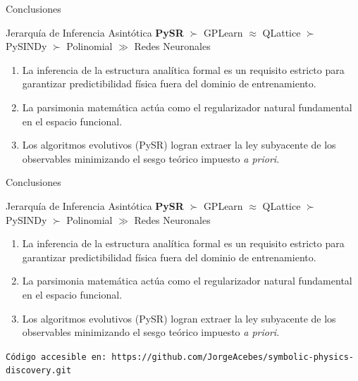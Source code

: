 \documentclass[10pt, aspectratio=169]{beamer}
\begin{document}
\begin{frame}{Conclusiones}
    \begin{block}{Jerarquía de Inferencia Asintótica}
        \centering\medskip
        \large \textbf{PySR} $\succ$ GPLearn $\approx$ QLattice $\succ$ PySINDy $\succ$ Polinomial $\gg$ Redes Neuronales
    \end{block}

    \vspace{0.5cm}
    \begin{enumerate}
        \item La inferencia de la estructura analítica formal es un requisito estricto para garantizar predictibilidad física fuera del dominio de entrenamiento.
        \item La parsimonia matemática actúa como el regularizador natural fundamental en el espacio funcional.
        \item Los algoritmos evolutivos (PySR) logran extraer la ley subyacente de los observables minimizando el sesgo teórico impuesto \textit{a priori}.
    \end{enumerate}


    
\end{frame}


\begin{frame}{Conclusiones}
    \begin{block}{Jerarquía de Inferencia Asintótica}
        \centering\medskip
        \large \textbf{PySR} $\succ$ GPLearn $\approx$ QLattice $\succ$ PySINDy $\succ$ Polinomial $\gg$ Redes Neuronales
    \end{block}

    \vspace{0.5cm}
    \begin{enumerate}
        \item La inferencia de la estructura analítica formal es un requisito estricto para garantizar predictibilidad física fuera del dominio de entrenamiento.
        \item La parsimonia matemática actúa como el regularizador natural fundamental en el espacio funcional.
        \item Los algoritmos evolutivos (PySR) logran extraer la ley subyacente de los observables minimizando el sesgo teórico impuesto \textit{a priori}.
    \end{enumerate}

    \vspace{5pt}
    \texttt{Código accesible en: \href{https://github.com/JorgeAcebes/symbolic-physics-discovery.git}{}https://github.com/JorgeAcebes/symbolic-physics-discovery.git}
\end{frame}
\end{document}
